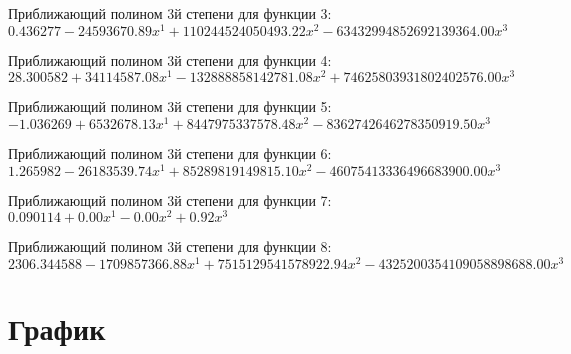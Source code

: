 \documentclass[a4paper,14pt]{extarticle}
\begin{document}
Приближающий полином 3й степени для функции 3: $0.436277 - 24593670.89x^1 + 110244524050493.22x^2 - 63432994852692139364.00x^3$

Приближающий полином 3й степени для функции 4: $28.300582 + 34114587.08x^1 - 132888858142781.08x^2 + 74625803931802402576.00x^3$

Приближающий полином 3й степени для функции 5: $-1.036269 + 6532678.13x^1 + 8447975337578.48x^2 - 8362742646278350919.50x^3$

Приближающий полином 3й степени для функции 6: $1.265982 - 26183539.74x^1 + 85289819149815.10x^2 - 46075413336496683900.00x^3$

Приближающий полином 3й степени для функции 7: $0.090114 + 0.00x^1 - 0.00x^2 + 0.92x^3$

Приближающий полином 3й степени для функции 8: $2306.344588 - 1709857366.88x^1 + 7515129541578922.94x^2 - 4325200354109058898688.00x^3$

\section{График}
\end{document}
